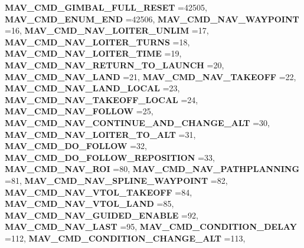 \begin{DoxyCompactItemize}
\newline
\textbf{ M\+A\+V\+\_\+\+C\+M\+D\+\_\+\+G\+I\+M\+B\+A\+L\+\_\+\+F\+U\+L\+L\+\_\+\+R\+E\+S\+ET} =42505, 
\textbf{ M\+A\+V\+\_\+\+C\+M\+D\+\_\+\+E\+N\+U\+M\+\_\+\+E\+ND} =42506, 
\textbf{ M\+A\+V\+\_\+\+C\+M\+D\+\_\+\+N\+A\+V\+\_\+\+W\+A\+Y\+P\+O\+I\+NT} =16, 
\textbf{ M\+A\+V\+\_\+\+C\+M\+D\+\_\+\+N\+A\+V\+\_\+\+L\+O\+I\+T\+E\+R\+\_\+\+U\+N\+L\+IM} =17, 
\newline
\textbf{ M\+A\+V\+\_\+\+C\+M\+D\+\_\+\+N\+A\+V\+\_\+\+L\+O\+I\+T\+E\+R\+\_\+\+T\+U\+R\+NS} =18, 
\textbf{ M\+A\+V\+\_\+\+C\+M\+D\+\_\+\+N\+A\+V\+\_\+\+L\+O\+I\+T\+E\+R\+\_\+\+T\+I\+ME} =19, 
\textbf{ M\+A\+V\+\_\+\+C\+M\+D\+\_\+\+N\+A\+V\+\_\+\+R\+E\+T\+U\+R\+N\+\_\+\+T\+O\+\_\+\+L\+A\+U\+N\+CH} =20, 
\textbf{ M\+A\+V\+\_\+\+C\+M\+D\+\_\+\+N\+A\+V\+\_\+\+L\+A\+ND} =21, 
\newline
\textbf{ M\+A\+V\+\_\+\+C\+M\+D\+\_\+\+N\+A\+V\+\_\+\+T\+A\+K\+E\+O\+FF} =22, 
\textbf{ M\+A\+V\+\_\+\+C\+M\+D\+\_\+\+N\+A\+V\+\_\+\+L\+A\+N\+D\+\_\+\+L\+O\+C\+AL} =23, 
\textbf{ M\+A\+V\+\_\+\+C\+M\+D\+\_\+\+N\+A\+V\+\_\+\+T\+A\+K\+E\+O\+F\+F\+\_\+\+L\+O\+C\+AL} =24, 
\textbf{ M\+A\+V\+\_\+\+C\+M\+D\+\_\+\+N\+A\+V\+\_\+\+F\+O\+L\+L\+OW} =25, 
\newline
\textbf{ M\+A\+V\+\_\+\+C\+M\+D\+\_\+\+N\+A\+V\+\_\+\+C\+O\+N\+T\+I\+N\+U\+E\+\_\+\+A\+N\+D\+\_\+\+C\+H\+A\+N\+G\+E\+\_\+\+A\+LT} =30, 
\textbf{ M\+A\+V\+\_\+\+C\+M\+D\+\_\+\+N\+A\+V\+\_\+\+L\+O\+I\+T\+E\+R\+\_\+\+T\+O\+\_\+\+A\+LT} =31, 
\textbf{ M\+A\+V\+\_\+\+C\+M\+D\+\_\+\+D\+O\+\_\+\+F\+O\+L\+L\+OW} =32, 
\textbf{ M\+A\+V\+\_\+\+C\+M\+D\+\_\+\+D\+O\+\_\+\+F\+O\+L\+L\+O\+W\+\_\+\+R\+E\+P\+O\+S\+I\+T\+I\+ON} =33, 
\newline
\textbf{ M\+A\+V\+\_\+\+C\+M\+D\+\_\+\+N\+A\+V\+\_\+\+R\+OI} =80, 
\textbf{ M\+A\+V\+\_\+\+C\+M\+D\+\_\+\+N\+A\+V\+\_\+\+P\+A\+T\+H\+P\+L\+A\+N\+N\+I\+NG} =81, 
\textbf{ M\+A\+V\+\_\+\+C\+M\+D\+\_\+\+N\+A\+V\+\_\+\+S\+P\+L\+I\+N\+E\+\_\+\+W\+A\+Y\+P\+O\+I\+NT} =82, 
\textbf{ M\+A\+V\+\_\+\+C\+M\+D\+\_\+\+N\+A\+V\+\_\+\+V\+T\+O\+L\+\_\+\+T\+A\+K\+E\+O\+FF} =84, 
\newline
\textbf{ M\+A\+V\+\_\+\+C\+M\+D\+\_\+\+N\+A\+V\+\_\+\+V\+T\+O\+L\+\_\+\+L\+A\+ND} =85, 
\textbf{ M\+A\+V\+\_\+\+C\+M\+D\+\_\+\+N\+A\+V\+\_\+\+G\+U\+I\+D\+E\+D\+\_\+\+E\+N\+A\+B\+LE} =92, 
\textbf{ M\+A\+V\+\_\+\+C\+M\+D\+\_\+\+N\+A\+V\+\_\+\+L\+A\+ST} =95, 
\textbf{ M\+A\+V\+\_\+\+C\+M\+D\+\_\+\+C\+O\+N\+D\+I\+T\+I\+O\+N\+\_\+\+D\+E\+L\+AY} =112, 
\newline
\textbf{ M\+A\+V\+\_\+\+C\+M\+D\+\_\+\+C\+O\+N\+D\+I\+T\+I\+O\+N\+\_\+\+C\+H\+A\+N\+G\+E\+\_\+\+A\+LT} =113, 

\end{DoxyCompactItemize}
